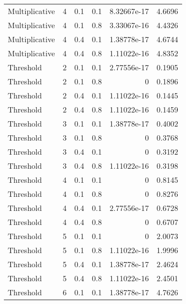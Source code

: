 \documentclass{article}
\begin{document}
\begin{figure}[H]
\begin{tabular}{lrrrrr}
 Multiplicative &       4 &   0.1 &            0.1 & 8.32667e-17 &            4.6696 \\
 Multiplicative &       4 &   0.1 &            0.8 & 3.33067e-16 &            4.4326 \\
 Multiplicative &       4 &   0.4 &            0.1 & 1.38778e-17 &            4.6744 \\
 Multiplicative &       4 &   0.4 &            0.8 & 1.11022e-16 &            4.8352 \\
 Threshold      &       2 &   0.1 &            0.1 & 2.77556e-17 &            0.1905 \\
 Threshold      &       2 &   0.1 &            0.8 & 0           &            0.1896 \\
 Threshold      &       2 &   0.4 &            0.1 & 1.11022e-16 &            0.1445 \\
 Threshold      &       2 &   0.4 &            0.8 & 1.11022e-16 &            0.1459 \\
 Threshold      &       3 &   0.1 &            0.1 & 1.38778e-17 &            0.4002 \\
 Threshold      &       3 &   0.1 &            0.8 & 0           &            0.3768 \\
 Threshold      &       3 &   0.4 &            0.1 & 0           &            0.3192 \\
 Threshold      &       3 &   0.4 &            0.8 & 1.11022e-16 &            0.3198 \\
 Threshold      &       4 &   0.1 &            0.1 & 0           &            0.8145 \\
 Threshold      &       4 &   0.1 &            0.8 & 0           &            0.8276 \\
 Threshold      &       4 &   0.4 &            0.1 & 2.77556e-17 &            0.6728 \\
 Threshold      &       4 &   0.4 &            0.8 & 0           &            0.6707 \\
 Threshold      &       5 &   0.1 &            0.1 & 0           &            2.0073 \\
 Threshold      &       5 &   0.1 &            0.8 & 1.11022e-16 &            1.9996 \\
 Threshold      &       5 &   0.4 &            0.1 & 1.38778e-17 &            2.4624 \\
 Threshold      &       5 &   0.4 &            0.8 & 1.11022e-16 &            2.4501 \\
 Threshold      &       6 &   0.1 &            0.1 & 1.38778e-17 &            4.7626 \\

\end{tabular}
\end{figure}
\end{document}
